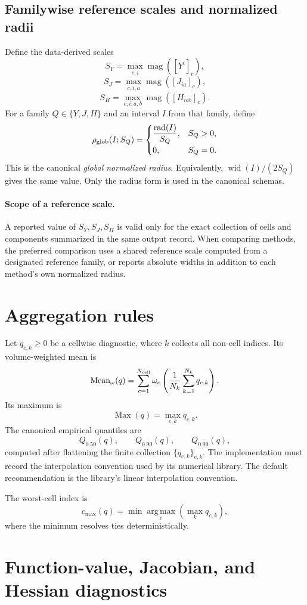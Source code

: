 \documentclass[11pt]{article}
\newcommand{\rad}{\operatorname{rad}}
\newcommand{\wid}{\operatorname{wid}}
\newcommand{\magI}{\operatorname{mag}}
\newcommand{\Mean}{\operatorname{Mean}}
\newcommand{\Max}{\operatorname{Max}}
\begin{document}
\subsection{Familywise reference scales and normalized radii}

Define the data-derived scales
\[
 S_Y=\max_{c,i}\magI([Y^i]_c),
\]
\[
 S_J=\max_{c,i,a}\magI([J_{ia}]_c),
\]
\[
 S_H=\max_{c,i,a,b}\magI([H_{iab}]_c).
\]
For a family \(Q\in\{Y,J,H\}\) and an interval \(I\) from that family,
define
\[
 \rho_{\rm glob}(I;S_Q)=
 \begin{cases}
  \dfrac{\rad(I)}{S_Q},&S_Q>0,\\[2mm]
  0,&S_Q=0.
 \end{cases}
\]
This is the canonical \emph{global normalized radius}.  Equivalently,
\(\wid(I)/(2S_Q)\) gives the same value.  Only the radius form is used in the
canonical schemas.

\paragraph{Scope of a reference scale.}
A reported value of \(S_Y,S_J,S_H\) is valid only for the exact collection of
cells and components summarized in the same output record.  When comparing
methods, the preferred comparison uses a shared reference scale computed from
a designated reference family, or reports absolute widths in addition to each
method's own normalized radius.

\section{Aggregation rules}

Let \(q_{c,k}\geq0\) be a cellwise diagnostic, where \(k\) collects all
non-cell indices.  Its volume-weighted mean is
\[
 \Mean_\omega(q)
 =\sum_{c=1}^{N_{\rm cell}}\omega_c
   \left(\frac1{N_k}\sum_{k=1}^{N_k}q_{c,k}\right).
\]
Its maximum is
\[
 \Max(q)=\max_{c,k}q_{c,k}.
\]
The canonical empirical quantiles are
\[
 Q_{0.50}(q),\qquad Q_{0.90}(q),\qquad Q_{0.99}(q),
\]
computed after flattening the finite collection \(\{q_{c,k}\}_{c,k}\).  The
implementation must record the interpolation convention used by its numerical
library.  The default recommendation is the library's linear interpolation
convention.

The worst-cell index is
\[
 c_{\max}(q)
 =\min\operatorname*{arg\,max}_c\left(\max_k q_{c,k}\right),
\]
where the minimum resolves ties deterministically.

\section{Function-value, Jacobian, and Hessian diagnostics}
\end{document}
